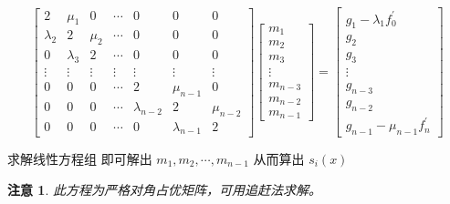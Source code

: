 \documentclass{ctexart}
\newtheorem{attention}{注意}
\numberwithin{equation}{section}
\begin{document}
\begin{equation}
    \begin{bmatrix}
    2 & \mu_{1} & 0 & \cdots & 0 & 0 & 0 \\
    \lambda_{2} & 2 & \mu_{2} & \cdots & 0 & 0 & 0 \\
    0 & \lambda_{3} & 2 & \cdots & 0 & 0 & 0 \\
    \vdots & \vdots & \vdots & \vdots & \vdots & \vdots & \vdots \\
    0 & 0 & 0 & \cdots & 2 &  \mu_{n-1} & 0 \\
    0 & 0 & 0 & \cdots & \lambda_{n-2} & 2 & \mu_{n-2} \\
    0 & 0 & 0 & \cdots & 0 & \lambda_{n-1} & 2
\end{bmatrix}\begin{bmatrix}
    m_{1} \\
    m_{2} \\
    m_{3} \\
    \vdots \\
    m_{n-3} \\
    m_{n-2} \\
    m_{n-1}
\end{bmatrix}  = 
    \begin{bmatrix}
    g_{1}-\lambda_{1} f_{0}^{\prime} \\
    g_{2} \\
    g_{3} \\
    \vdots \\
    g_{n-3} \\
    g_{n-2} \\
    g_{n-1}-\mu_{n-1} f_{n}^{\prime}
\end{bmatrix}
\label{eq:4}
\end{equation}

求解线性方程组  即可解出 $m_1,m_2,\cdots,m_{n-1}$ 从而算出 $s_i(x)$

\begin{attention}
    此方程为严格对角占优矩阵，可用追赶法求解。
\end{attention}
\end{document}

